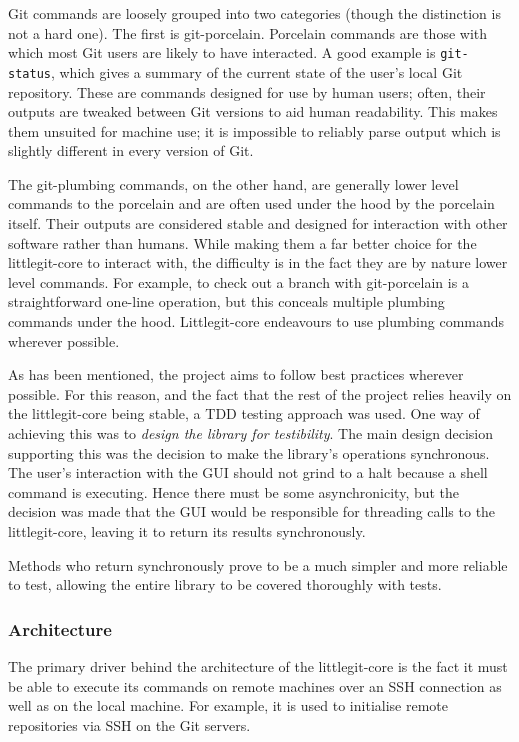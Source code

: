 Git commands are loosely grouped into two categories (though the distinction is not a hard one). The first is git-porcelain. Porcelain commands are those with which most Git users are likely to have interacted. A good example is \texttt{git-status}, which gives a summary of the current state of the user's local Git repository. These are commands designed for use by human users; often, their outputs are tweaked between Git versions to aid human readability. This makes them unsuited for machine use; it is impossible to reliably parse output which is slightly different in every version of Git.

The git-plumbing commands, on the other hand, are generally lower level commands to the porcelain and are often used under the hood by the porcelain itself. Their outputs are considered stable and designed for interaction with other software rather than humans. While making them a far better choice for the littlegit-core to interact with, the difficulty is in the fact they are by nature lower level commands. For example, to check out a branch with git-porcelain is a straightforward one-line operation, but this conceals multiple plumbing commands under the hood. Littlegit-core endeavours to use plumbing commands wherever possible.

As has been mentioned, the project aims to follow best practices wherever possible. For this reason, and the fact that the rest of the project relies heavily on the littlegit-core being stable, a TDD testing approach was used. One way of achieving this was to \emph{design the library for testibility}. The main design decision supporting this was the decision to make the library's operations synchronous. The user's interaction with the GUI should not grind to a halt because a shell command is executing. Hence there must be some asynchronicity, but the decision was made that the GUI would be responsible for threading calls to the littlegit-core, leaving it to return its results synchronously.

Methods who return synchronously prove to be a much simpler and more reliable to test, allowing the entire library to be covered thoroughly with tests.

\subsubsection{Architecture}

The primary driver behind the architecture of the littlegit-core is the fact it must be able to execute its commands on remote machines over an SSH connection as well as on the local machine. For example, it is used to initialise remote repositories via SSH on the Git servers.

